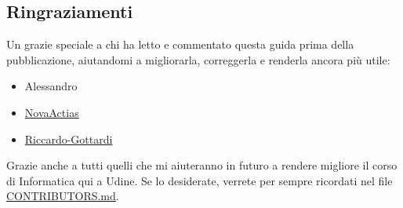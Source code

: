 \documentclass[18pt]{extarticle}
\begin{document}
\subsection*{Ringraziamenti}
Un grazie speciale a chi ha letto e commentato questa guida prima della pubblicazione, aiutandomi a migliorarla, correggerla e renderla ancora più utile:
\begin{itemize}
\item Alessandro
\item \href{https://github.com/NovaActias}{NovaActias}
\item \href{https://github.com/Riccardo-Gottardi}{Riccardo-Gottardi}
\end{itemize}
Grazie anche a tutti quelli che mi aiuteranno in futuro a rendere migliore il corso di Informatica qui a Udine. Se lo desiderate, verrete per sempre ricordati nel file \href{https://github.com/Verryx-02/Scuola-di-sopravvivenza-per-studenti-di-Informatica/blob/main/CONTRIBUTORS.md}{CONTRIBUTORS.md}.\\
\end{document}
